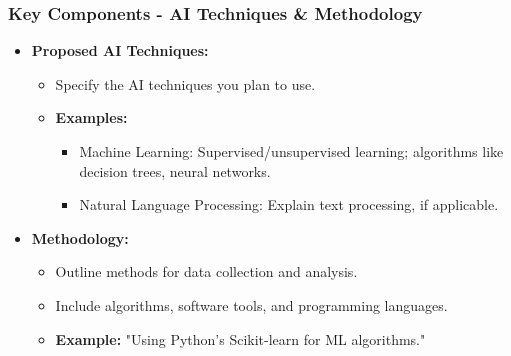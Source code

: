 \documentclass{beamer}
\begin{document}
\begin{frame}[fragile]
    \frametitle{Key Components - AI Techniques & Methodology}
    \begin{itemize}
        \item \textbf{Proposed AI Techniques:}
        \begin{itemize}
            \item Specify the AI techniques you plan to use.
            \item \textbf{Examples:}
            \begin{itemize}
                \item Machine Learning: Supervised/unsupervised learning; algorithms like decision trees, neural networks.
                \item Natural Language Processing: Explain text processing, if applicable.
            \end{itemize}
        \end{itemize}

        \item \textbf{Methodology:}
        \begin{itemize}
            \item Outline methods for data collection and analysis.
            \item Include algorithms, software tools, and programming languages.
            \item \textbf{Example:} "Using Python's Scikit-learn for ML algorithms."
        \end{itemize}
    \end{itemize}
\end{frame}
\end{document}
